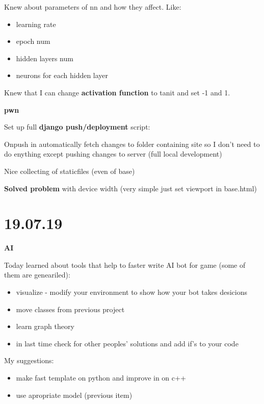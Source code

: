 \documentclass[12pt,a4paper,titlepage]{article}
\begin{document}
Knew about parameters of nn and how they affect. Like:
\begin{itemize}
    \item learning rate
    \item epoch num
    \item hidden layers num
    \item neurons for each hidden layer
\end{itemize}

Knew that I can change \textbf{activation function} to tanit and set -1 and 1.

\begin{center}
    \large \textbf{pwn}
\end{center}

Set up full \textbf{django push/deployment} script:

Onpush in automatically fetch changes to folder con\-ta\-ining si\-te so I don't ne\-ed to do enything except pushing changes to server (full local deve\-lop\-ment)

Nice collecting of staticfiles (even of base)

\textbf{Solved problem} with device width (very simple just set view\-port in base.html)

\newpage
\section{19.07.19}
\begin{center}
    \large \textbf{AI}
\end{center}

Today learned about tools that help to faster write AI bot for game (some of them are geneariled):
\begin{itemize}
    \item visualize - modify your environment to show how your bot takes desi\-cions
    \item move classes from previous project
    \item learn graph theory
    \item in last time check for other peoples' solutions and add if's to your code
\end{itemize}

My suggestions:
\begin{itemize}
    \item make fast template on python and improve in on c++
    \item use apropriate model (previous item)
\end{itemize}
\end{document}
